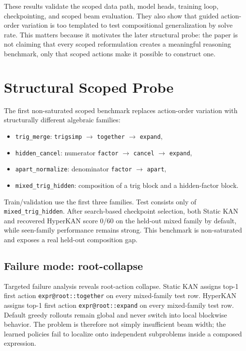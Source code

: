 \documentclass[11pt]{article}
\newcommand{\hyperkan}{HyperKAN}
\newcommand{\staticKAN}{Static KAN}
\begin{document}
These results validate the scoped data path, model heads, training loop, checkpointing, and scoped beam evaluation. They also show that guided action-order variation is too templated to test compositional generalization by solve rate. This matters because it motivates the later structural probe: the paper is not claiming that every scoped reformulation creates a meaningful reasoning benchmark, only that scoped actions make it possible to construct one.

\section{Structural Scoped Probe}

The first non-saturated scoped benchmark replaces action-order variation with structurally different algebraic families:
\begin{itemize}
  \item \texttt{trig\_merge}: \texttt{trigsimp} $\rightarrow$ \texttt{together} $\rightarrow$ \texttt{expand},
  \item \texttt{hidden\_cancel}: numerator \texttt{factor} $\rightarrow$ \texttt{cancel} $\rightarrow$ \texttt{expand},
  \item \texttt{apart\_normalize}: denominator \texttt{factor} $\rightarrow$ \texttt{apart},
  \item \texttt{mixed\_trig\_hidden}: composition of a trig block and a hidden-factor block.
\end{itemize}

Train/validation use the first three families. Test consists only of \texttt{mixed\_trig\_hidden}. After search-based checkpoint selection, both \staticKAN{} and recovered \hyperkan{} score 0/60 on the held-out mixed family by default, while seen-family performance remains strong. This benchmark is non-saturated and exposes a real held-out composition gap.

\subsection{Failure mode: root-collapse}

Targeted failure analysis reveals root-action collapse. \staticKAN{} assigns top-1 first action \texttt{expr@root::together} on every mixed-family test row. \hyperkan{} assigns top-1 first action \texttt{expr@root::expand} on every mixed-family test row. Default greedy rollouts remain global and never switch into local blockwise behavior. The problem is therefore not simply insufficient beam width; the learned policies fail to localize onto independent subproblems inside a composed expression.
\end{document}
